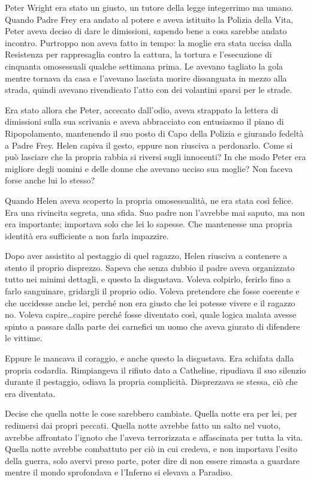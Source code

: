 Peter Wright era stato un giusto, un tutore della legge integerrimo ma umano. Quando Padre Frey era
andato al potere e aveva istituito la Polizia della Vita, Peter aveva deciso di dare le dimissioni,
sapendo bene a cosa sarebbe andato incontro. Purtroppo non aveva fatto in tempo: la moglie era stata
uccisa dalla Resistenza per rappresaglia contro la cattura, la tortura e l'esecuzione di cinquanta
omosessuali qualche settimana prima. Le avevano tagliato la gola mentre tornava da casa e l'avevano
lasciata morire dissanguata in mezzo alla strada, quindi avevano rivendicato l'atto con dei
volantini sparsi per le strade.

Era stato allora che Peter, accecato dall'odio, aveva strappato la lettera di dimissioni sulla sua
scrivania e aveva abbracciato con entusiasmo il piano di Ripopolamento, mantenendo il suo posto di
Capo della Polizia e giurando fedeltà a Padre Frey. Helen capiva il gesto, eppure non riusciva a
perdonarlo. Come si può lasciare che la propria rabbia si riversi sugli innocenti? In che modo Peter
era migliore degli uomini e delle donne che avevano ucciso sua moglie? Non faceva forse anche lui lo
stesso?

Quando Helen aveva scoperto la propria omosessualità, ne era stata così felice. Era una rivincita
segreta, una sfida. Suo padre non l'avrebbe mai saputo, ma non era importante; importava solo che
lei lo sapesse. Che mantenesse una propria identità era sufficiente a non farla impazzire.

Dopo aver assistito al pestaggio di quel ragazzo, Helen riusciva a contenere a stento il proprio
disprezzo. Sapeva che senza dubbio il padre aveva organizzato tutto nei minimi dettagli, e questo la
disgustava. Voleva colpirlo, ferirlo fino a farlo sanguinare, gridargli il proprio odio. Voleva
pretendere che fosse coerente e che uccidesse anche lei, perché non era giusto che lei potesse
vivere e il ragazzo no. Voleva capire\dots capire perché fosse diventato così, quale logica malata
avesse spinto a passare dalla parte dei carnefici un uomo che aveva giurato di difendere le vittime.

Eppure le mancava il coraggio, e anche questo la disgustava. Era schifata dalla propria codardia.
Rimpiangeva il rifiuto dato a Catheline, ripudiava il suo silenzio durante il pestaggio, odiava la
propria complicità. Disprezzava se stessa, ciò che era diventata.

Decise che quella notte le cose sarebbero cambiate. Quella notte era per lei, per redimersi dai
propri peccati. Quella notte avrebbe fatto un salto nel vuoto, avrebbe affrontato l'ignoto che
l'aveva terrorizzata e affascinata per tutta la vita. Quella notte avrebbe combattuto per ciò in cui
credeva, e non importava l'esito della guerra, solo avervi preso parte, poter dire di non essere
rimasta a guardare mentre il mondo sprofondava e l'Inferno si elevava a Paradiso.


